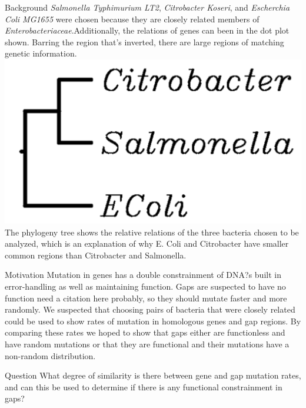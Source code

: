 \documentclass[final]{beamer}
\begin{document}
\begin{frame}{}
\begin{columns}[t]
\begin{column}{.32 \linewidth}
\begin{block}{\large Background}
\newline
\textit{Salmonella Typhimurium LT2}, \textit{Citrobacter Koseri}, and \textit{Escherchia Coli MG1655} were chosen because they are closely related members of \textit{Enterobacteriaceae}.Additionally, the relations of genes can been in the dot plot shown. Barring the region that's inverted, there are large regions of matching genetic information.
\newline
\includegraphics[scale = 1]{phylogeny.png}
\newline
The phylogeny tree shows the relative relations of the three bacteria chosen to be analyzed, which is an explanation of why E. Coli and Citrobacter have smaller common regions than Citrobacter and Salmonella.
\end{block}

 \begin{block}{\large Motivation}
Mutation in genes has a double constrainment of DNA?s built in error-handling as well as maintaining function. Gaps are suspected to have no function need a citation here probably, so they should mutate faster and more randomly. We suspected that choosing pairs of bacteria that were closely related could be used to show rates of mutation in homologous genes and gap regions. By comparing these rates we hoped to show that gaps either are functionless and have random mutations or that they are functional and their mutations have a non-random distribution.
\end{block}

\begin{block}{\large Question}
What degree of similarity is there between gene and gap mutation rates, and can this be used to determine if there is any functional constrainment in gaps? 
\end{block}




\end{column}
\end{columns}
\end{frame}
\end{document}
